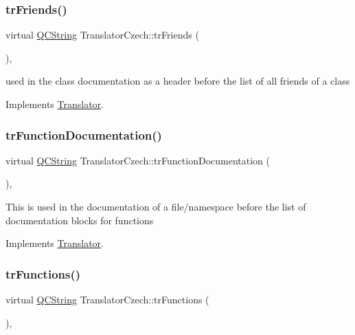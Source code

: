 \subsubsection{\texorpdfstring{trFriends()}{trFriends()}}
{\footnotesize\ttfamily virtual \mbox{\hyperlink{class_q_c_string}{Q\+C\+String}} Translator\+Czech\+::tr\+Friends (\begin{DoxyParamCaption}{ }\end{DoxyParamCaption})\hspace{0.3cm}{\ttfamily [inline]}, {\ttfamily [virtual]}}

used in the class documentation as a header before the list of all friends of a class 

Implements \mbox{\hyperlink{class_translator}{Translator}}.

\mbox{\label{class_translator_czech_abb1c718f12c618ba67277f4ae175fb56}} 
\subsubsection{\texorpdfstring{trFunctionDocumentation()}{trFunctionDocumentation()}}
{\footnotesize\ttfamily virtual \mbox{\hyperlink{class_q_c_string}{Q\+C\+String}} Translator\+Czech\+::tr\+Function\+Documentation (\begin{DoxyParamCaption}{ }\end{DoxyParamCaption})\hspace{0.3cm}{\ttfamily [inline]}, {\ttfamily [virtual]}}

This is used in the documentation of a file/namespace before the list of documentation blocks for functions 

Implements \mbox{\hyperlink{class_translator}{Translator}}.

\mbox{\label{class_translator_czech_a4cc60c7408d119365763cd018c6f406c}} 
\subsubsection{\texorpdfstring{trFunctions()}{trFunctions()}}
{\footnotesize\ttfamily virtual \mbox{\hyperlink{class_q_c_string}{Q\+C\+String}} Translator\+Czech\+::tr\+Functions (\begin{DoxyParamCaption}{ }\end{DoxyParamCaption})\hspace{0.3cm}{\ttfamily [inline]}, {\ttfamily [virtual]}}

